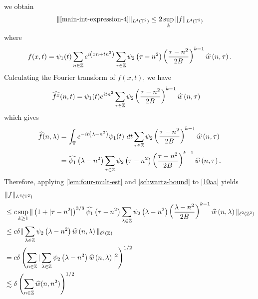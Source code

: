 %
%
we obtain
%
%
\begin{equation}
	\label{10aa}
	\begin{split}
		\|\eqref{main-int-expression-4}\|_{L^4(\mathbb{T}^2)} 
		\le 2 \sup_k \|f \|_{L^4(\mathbb{T}^2)}
	\end{split}
\end{equation}
%
%
where $$f(x,t) = \psi_1(t) \sum_{n \in \mathbb{Z}} e^{i\left( xn + tn^2 \right)} 
		\sum_{\tau \in \mathbb{Z}} \psi_2\left( \tau - n^2 
		\right)\left (\frac{ \tau - n^2}{2B}\right)^{k - 1} \widehat{w}\left( n, \tau 
		\right).$$
%
%
Calculating the Fourier transform of $f(x, t)$, we have
\begin{equation*}
	\begin{split}
		& \widehat{f^x}(n, t) = \psi_1(t) e^{itn^2} \sum_{\tau \in \mathbb{Z}} 
		\psi_2\left (\frac{ \tau - n^2}{2B}\right)^{k - 1}
		\widehat{w}\left( n, \tau \right)
	\end{split}
\end{equation*}
which gives
\begin{equation*}
	\begin{split}
		\widehat{f}(n, \lambda)
		& = \int_{\mathbb{T}} e^{-it\left( \lambda - n^2 \right)} 
		\psi_1(t) \ dt \sum_{\tau \in \mathbb{Z}} \psi_2
		\left (\frac{ \tau - n^2}{2B}\right)^{k - 1}
\widehat{w}\left( n, \tau 
		\right)
		\\
		&  = \widehat{\psi_1}\left( \lambda - n^2 \right) \sum_{\tau \in \mathbb{Z}} 
		\psi_2\left( \tau - n^2 \right)
		\left (\frac{ \tau - n^2}{2B}\right)^{k - 1}
		\widehat{w} \left(n, \tau \right).
	\end{split}
\end{equation*}
%
%
Therefore, applying \cref{lem:four-mult-est} and 
\eqref{schwartz-bound} to \eqref{10aa} yields
%
%
\begin{equation}
	\label{main-int-4-est-prelim}
	\begin{split}
		& \|f\|_{L^4(\mathbb{T}^2)} 
		\\
		& \le c \sup_{k \ge 1} \|\left( 1 + |\tau - n^2| 
		\right)^{3/8} \widehat{\psi_1}\left( \tau - n^2 \right) \sum_{\lambda 
		\in \mathbb{Z}} \psi_2\left( \lambda - n^2 \right)\left( \frac{\lambda - 
		n^2}{2B} 
		\right)^{k - 1} \widehat{w}\left( n, \lambda \right) \|_{\ell^2(\mathbb{Z}^2)}
		\\
		& \le c \delta \| \sum_{\lambda \in \mathbb{Z}} 
		\psi_2\left( \lambda - n^2 \right) \widehat{w}\left( n, \lambda \right)\|_{\ell^2(\mathbb{Z})}
		\\
		& = c \delta \left( \sum_{n \in \mathbb{Z}} | 
		\sum_{\lambda \in \mathbb{Z}} \psi_2\left( \lambda - n^2 \right) 
		\widehat{w}\left( n, \lambda \right)|^2\right)^{1/2}
		\\
		& \lesssim \delta \left( \sum_{n \in \mathbb{Z}} \widehat{w}(n, 
		n^2) \right)^{1/2}
	\end{split}
\end{equation}
